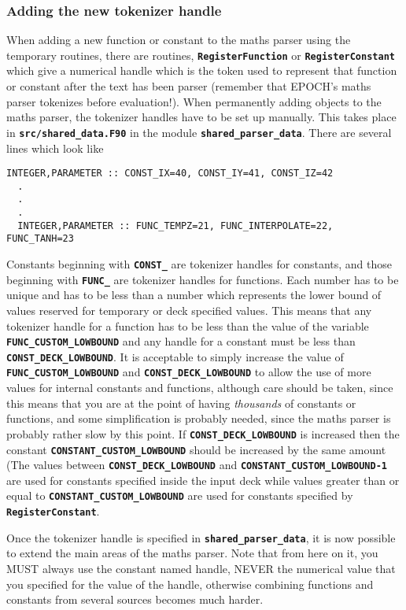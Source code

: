 \documentclass[12pt]{article}
\newcommand{\simpleboxverbatim}{\begin{Verbatim}[obeytabs=true,frame=single,
  framerule=0.5mm,rulecolor=\color{warwickmid}]}
\newcommand{\inlinecode}[1]{{\color{warwickred} \bf\texttt{#1}}}
\begin{document}
\subsubsection{Adding the new tokenizer handle}
When adding a new function or constant to the maths parser using the temporary
routines, there are routines, \inlinecode{RegisterFunction} or
\inlinecode{RegisterConstant} which give a numerical handle which is the token
used to represent that function or constant after the text has been parser
(remember that EPOCH's maths parser tokenizes before evaluation!). When
permanently adding objects to the maths parser, the tokenizer handles have to
be set up manually. This takes place in \inlinecode{src/shared\_data.F90} in
the module \inlinecode{shared\_parser\_data}. There are several lines which
look like
\simpleboxverbatim
  INTEGER,PARAMETER :: CONST_IX=40, CONST_IY=41, CONST_IZ=42
  .
  .
  .
  INTEGER,PARAMETER :: FUNC_TEMPZ=21, FUNC_INTERPOLATE=22, FUNC_TANH=23
\end{Verbatim}
Constants beginning with \inlinecode{CONST\_} are tokenizer handles for
constants, and those beginning with \inlinecode{FUNC\_} are tokenizer handles
for functions. Each number has to be unique and has to be less than a number
which represents the lower bound of values reserved for temporary or deck
specified values. This means that any tokenizer handle for a function has to be
less than the value of the variable \inlinecode{FUNC\_CUSTOM\_LOWBOUND} and any
handle for a constant must be less than \inlinecode{CONST\_DECK\_LOWBOUND}. It
is acceptable to simply increase the value of
\inlinecode{FUNC\_CUSTOM\_LOWBOUND} and \inlinecode{CONST\_DECK\_LOWBOUND} to
allow the use of more values for internal constants and functions, although
care should be taken, since this means that you are at the point of having {\it
thousands} of constants or functions, and some simplification is probably
needed, since the maths parser is probably rather slow by this point. If
\inlinecode{CONST\_DECK\_LOWBOUND} is increased then the constant
\inlinecode{CONSTANT\_CUSTOM\_LOWBOUND} should be increased by the same amount
(The values between \inlinecode{CONST\_DECK\_LOWBOUND} and
\inlinecode{CONSTANT\_CUSTOM\_LOWBOUND-1} are used for constants specified
inside the input deck while values greater than or equal to
\inlinecode{CONSTANT\_CUSTOM\_LOWBOUND} are used for constants specified by
\inlinecode{RegisterConstant}.

Once the tokenizer handle is specified in \inlinecode{shared\_parser\_data}, it
is now possible to extend the main areas of the maths parser. Note that from
here on it, you MUST always use the constant named handle, NEVER the numerical
value that you specified for the value of the handle, otherwise combining
functions and constants from several sources becomes much harder.
\end{document}
